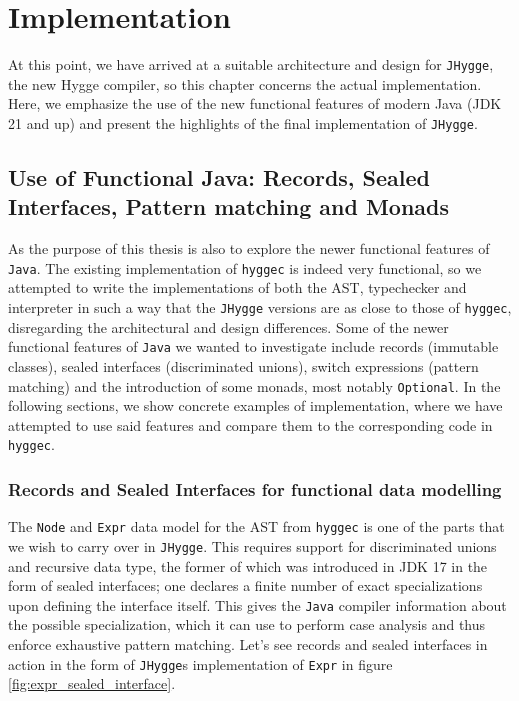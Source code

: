 \chapter{Implementation}

At this point, we have arrived at a suitable architecture and design for \texttt{JHygge}, the new Hygge compiler, so this chapter concerns the actual
implementation. Here, we emphasize the use of the new functional features of modern Java (JDK 21 and up) and present the highlights
of the final implementation of \texttt{JHygge}. 

\section{Use of Functional Java: Records, Sealed Interfaces, Pattern matching and Monads}

As the purpose of this thesis is also to explore the newer functional features of \texttt{Java}. The existing implementation of \texttt{hyggec}
is indeed very functional, so we attempted to write the implementations of both the AST, typechecker and interpreter in such a way that
the \texttt{JHygge} versions are as close to those of \texttt{hyggec}, disregarding the architectural and design differences. Some of
the newer functional features of \texttt{Java} we wanted to investigate include records\cite{java_record}\cite{jep395} (immutable classes), sealed interfaces (discriminated unions)\cite{jep409},
switch expressions (pattern matching) and the introduction of some monads, most notably \texttt{Optional}. In the following sections,
we show concrete examples of implementation, where we have attempted to use said features and compare them to the corresponding code
in \texttt{hyggec}.

\subsection{Records and Sealed Interfaces for functional data modelling}

The \texttt{Node} and \texttt{Expr} data model for the AST from \texttt{hyggec} is one of the parts that we wish to carry over in \texttt{JHygge}.
This requires support for discriminated unions and recursive data type, the former of which was introduced in JDK 17 in the form of sealed
interfaces; one declares a finite number of exact specializations upon defining the interface itself. This gives the \texttt{Java} compiler
information about the possible specialization, which it can use to perform case analysis and thus enforce exhaustive pattern matching. Let's
see records and sealed interfaces in action in the form of \texttt{JHygge}s implementation of \texttt{Expr} in figure \ref{fig:expr_sealed_interface}.

